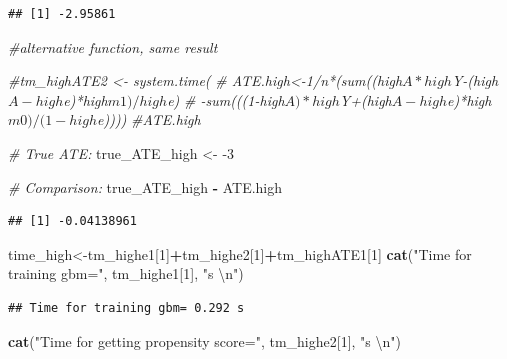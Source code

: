 \documentclass[]{article}
\newenvironment{Shaded}{\begin{snugshade}}{\end{snugshade}}
\newcommand{\CharTok}[1]{\textcolor[rgb]{0.31,0.60,0.02}{#1}}
\newcommand{\CommentTok}[1]{\textcolor[rgb]{0.56,0.35,0.01}{\textit{#1}}}
\newcommand{\DecValTok}[1]{\textcolor[rgb]{0.00,0.00,0.81}{#1}}
\newcommand{\KeywordTok}[1]{\textcolor[rgb]{0.13,0.29,0.53}{\textbf{#1}}}
\newcommand{\NormalTok}[1]{#1}
\newcommand{\OperatorTok}[1]{\textcolor[rgb]{0.81,0.36,0.00}{\textbf{#1}}}
\newcommand{\StringTok}[1]{\textcolor[rgb]{0.31,0.60,0.02}{#1}}
\begin{document}
\begin{verbatim}
## [1] -2.95861
\end{verbatim}

\begin{Shaded}
\begin{Highlighting}[]
\CommentTok{#alternative function, same result}

\CommentTok{#tm_highATE2 <- system.time(}
\CommentTok{#  ATE.high<-1/n*(sum((high$A*high$Y-(high$A-high$e)*high$m1)/high$e)}
\CommentTok{#            -sum(((1-high$A)*high$Y+(high$A-high$e)*high$m0)/(1-high$e))))}
\CommentTok{#ATE.high}
\end{Highlighting}
\end{Shaded}

\begin{Shaded}
\begin{Highlighting}[]
\CommentTok{# True ATE:}
\NormalTok{true_ATE_high <-}\StringTok{ }\DecValTok{-3}

\CommentTok{# Comparison:}
\NormalTok{true_ATE_high }\OperatorTok{-}\StringTok{ }\NormalTok{ATE.high}
\end{Highlighting}
\end{Shaded}

\begin{verbatim}
## [1] -0.04138961
\end{verbatim}

\begin{Shaded}
\begin{Highlighting}[]
\NormalTok{time_high<-tm_highe1[}\DecValTok{1}\NormalTok{]}\OperatorTok{+}\NormalTok{tm_highe2[}\DecValTok{1}\NormalTok{]}\OperatorTok{+}\NormalTok{tm_highATE1[}\DecValTok{1}\NormalTok{]}
\KeywordTok{cat}\NormalTok{(}\StringTok{"Time for training gbm="}\NormalTok{, tm_highe1[}\DecValTok{1}\NormalTok{], }\StringTok{"s }\CharTok{\textbackslash{}n}\StringTok{"}\NormalTok{)}
\end{Highlighting}
\end{Shaded}

\begin{verbatim}
## Time for training gbm= 0.292 s
\end{verbatim}

\begin{Shaded}
\begin{Highlighting}[]
\KeywordTok{cat}\NormalTok{(}\StringTok{"Time for getting propensity score="}\NormalTok{, tm_highe2[}\DecValTok{1}\NormalTok{], }\StringTok{"s }\CharTok{\textbackslash{}n}\StringTok{"}\NormalTok{)}
\end{Highlighting}
\end{Shaded}
\end{document}
